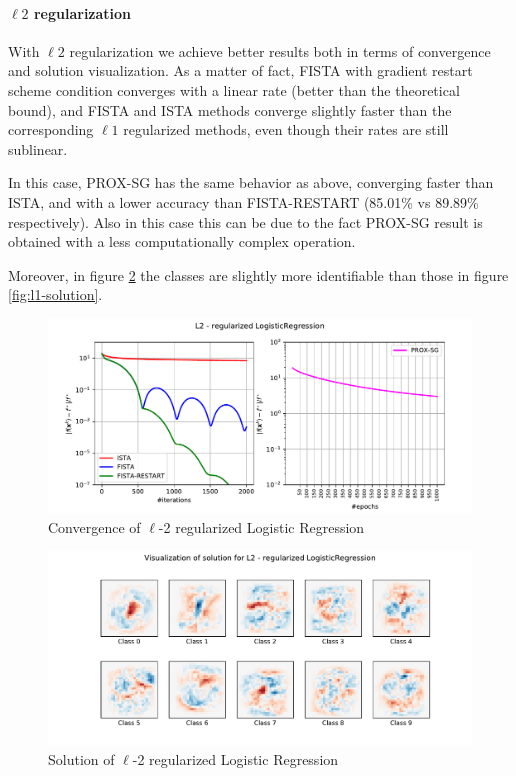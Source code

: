 \documentclass[12pt]{article}
\begin{document}
\paragraph{\texorpdfstring{$\ell2$ regularization}{Lg}}
With $\ell2$ regularization we achieve better results both in terms of convergence and solution visualization. As a matter of fact, FISTA with gradient restart scheme condition converges with a linear rate (better than the theoretical bound), and FISTA and ISTA methods converge slightly faster than the corresponding $\ell1$ regularized methods, even though their rates are still sublinear.

In this case, PROX-SG has the same behavior as above, converging faster than ISTA, and with a lower accuracy than FISTA-RESTART (85.01\% vs 89.89\% respectively). Also in this case this can be due to the fact PROX-SG result is obtained with a less computationally complex operation.

Moreover, in figure \ref{fig:l2-solution} the classes are slightly more identifiable than those in figure \ref{fig:l1-solution}.

\begin{figure}[H]
    \centering
    \includegraphics[width=17cm]{hw3/codes/exercise1/results/l2.pdf}
    \caption{Convergence of $\ell$-2 regularized Logistic Regression}
    \label{fig:l2-convergence}
\end{figure}

\begin{figure}[H]
    \centering
    \includegraphics[width=17cm]{hw3/codes/exercise1/results/l2-numbers.pdf}
    \caption{Solution of $\ell$-2 regularized Logistic Regression}
    \label{fig:l2-solution}
\end{figure}
\end{document}
